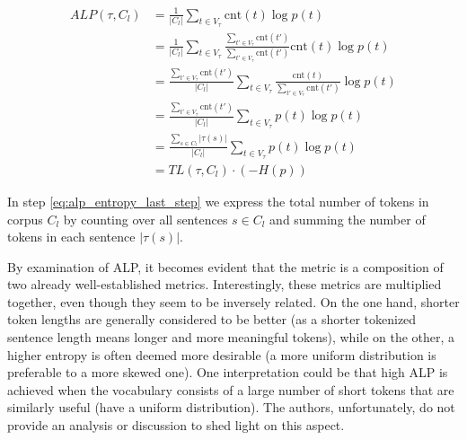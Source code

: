 \begin{align}
ALP(\tau, C_l) &= \frac{1}{|C_l|} \sum_{t \in V_\tau} \mathrm{cnt}(t) \log p(t) \\
&= \frac{1}{|C_l|} \sum_{t \in V_\tau} \frac{\sum_{t' \in V_\tau} \mathrm{cnt}(t')}{\sum_{t' \in V_\tau} \mathrm{cnt}(t')} \mathrm{cnt}(t) \log p(t) \\
&= \frac{\sum_{t' \in V_\tau} \mathrm{cnt}(t')}{|C_l|} \sum_{t \in V_\tau} \frac{\mathrm{cnt}(t)}{\sum_{t' \in V_\tau} \mathrm{cnt}(t')} \log p(t) \\
&= \frac{\sum_{t' \in V_\tau} \mathrm{cnt}(t')}{|C_l|} \sum_{t \in V_\tau} p(t) \log p(t) \\
&= \frac{\sum_{s \in C_l}|\tau(s)|}{|C_l|} \sum_{t \in V_\tau} p(t) \log p(t) \label{eq:alp_entropy_last_step}\\
&= TL(\tau, C_l) \cdot (- H(p))
\end{align}

In step \ref{eq:alp_entropy_last_step} we express the total number of tokens in corpus $C_l$ by counting over all sentences $s \in C_l$ and summing the number of tokens in each sentence $|\tau(s)|$.


By examination of ALP, it becomes evident that the metric is a composition of two already well-established metrics. Interestingly, these metrics are multiplied together, even though they seem to be inversely related. On the one hand, shorter token lengths are generally considered to be better (as a shorter tokenized sentence length means longer and more meaningful tokens), while on the other, a higher entropy is often deemed more desirable (a more uniform distribution is preferable to a more skewed one). One interpretation could be that high ALP is achieved when the vocabulary consists of a large number of short tokens that are similarly useful (have a uniform distribution). The authors, unfortunately, do not provide an analysis or discussion to shed light on this aspect. 

